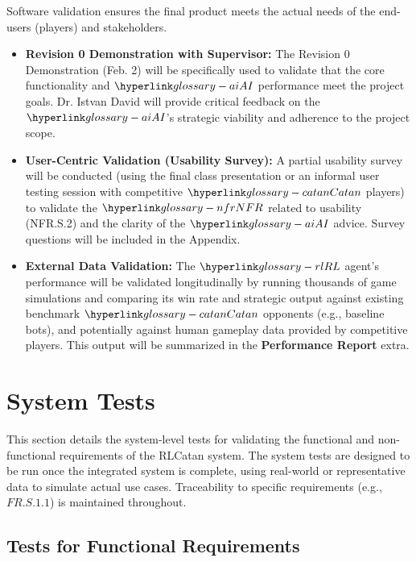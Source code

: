 \documentclass[12pt, titlepage]{article}
\begin{document}
Software validation ensures the final product meets the actual needs of the end-users (players) and stakeholders.

\begin{itemize}
    \item \textbf{Revision 0 Demonstration with Supervisor:} The Revision 0 Demonstration (Feb. 2) will be specifically used to validate that the core functionality and $\AI{}$ performance meet the project goals. Dr. Istvan David will provide critical feedback on the $\AI{}$'s strategic viability and adherence to the project scope.
    \item \textbf{User-Centric Validation (Usability Survey):} A partial usability survey will be conducted (using the final class presentation or an informal user testing session with competitive $\Catan{}$ players) to validate the $\NFR{}$ related to usability (NFR.S.2) and the clarity of the $\AI{}$ advice. Survey questions will be included in the Appendix.
    \item \textbf{External Data Validation:} The $\RL{}$ agent's performance will be validated longitudinally by running thousands of game simulations and comparing its win rate and strategic output against existing benchmark $\Catan{}$ opponents (e.g., baseline bots), and potentially against human gameplay data provided by competitive players. This output will be summarized in the \textbf{Performance Report} extra.
\end{itemize}


\section{System Tests}



This section details the system-level tests for validating the functional and non-functional requirements of the RLCatan system.
The system tests are designed to be run once the integrated system is complete, using real-world or representative data to simulate actual use cases.
Traceability to specific requirements (e.g., $\hyperref[FR.S.1.1]{FR.S.1.1}$) is maintained throughout.



\subsection{Tests for Functional Requirements}
\end{document}

